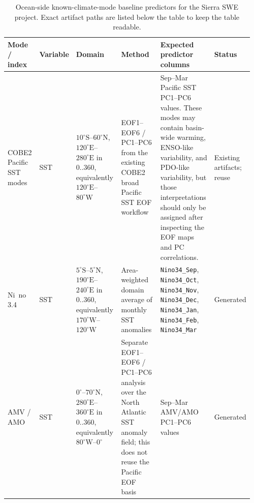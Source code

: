 \documentclass[11pt]{article}
\begin{document}
\begin{table}[h]
\centering
\small
\begin{tabular}{>{\raggedright\arraybackslash}p{0.14\linewidth}
                >{\raggedright\arraybackslash}p{0.08\linewidth}
                >{\raggedright\arraybackslash}p{0.20\linewidth}
                >{\raggedright\arraybackslash}p{0.20\linewidth}
                >{\raggedright\arraybackslash}p{0.24\linewidth}
                >{\raggedright\arraybackslash}p{0.10\linewidth}}
\toprule
Mode / index & Variable & Domain & Method & Expected predictor columns & Status \\
\midrule
COBE2 Pacific SST modes
& SST
& $10^\circ\mathrm{S}$--$60^\circ\mathrm{N}$, $120^\circ\mathrm{E}$--$280^\circ\mathrm{E}$ in $0..360$, equivalently $120^\circ\mathrm{E}$--$80^\circ\mathrm{W}$
& EOF1--EOF6 / PC1--PC6 from the existing COBE2 broad Pacific SST EOF workflow
& Sep--Mar Pacific SST PC1--PC6 values. These modes may contain basin-wide warming, ENSO-like variability, and PDO-like variability, but those interpretations should only be assigned after inspecting the EOF maps and PC correlations.
& Existing artifacts; reuse \\

Ni~no 3.4
& SST
& $5^\circ\mathrm{S}$--$5^\circ\mathrm{N}$, $190^\circ\mathrm{E}$--$240^\circ\mathrm{E}$ in $0..360$, equivalently $170^\circ\mathrm{W}$--$120^\circ\mathrm{W}$
& Area-weighted domain average of monthly SST anomalies
& \texttt{Nino34\_Sep}, \texttt{Nino34\_Oct}, \texttt{Nino34\_Nov}, \texttt{Nino34\_Dec}, \texttt{Nino34\_Jan}, \texttt{Nino34\_Feb}, \texttt{Nino34\_Mar}
& Generated \\

AMV / AMO
& SST
& $0^\circ$--$70^\circ\mathrm{N}$, $280^\circ\mathrm{E}$--$360^\circ\mathrm{E}$ in $0..360$, equivalently $80^\circ\mathrm{W}$--$0^\circ$
& Separate EOF1--EOF6 / PC1--PC6 analysis over the North Atlantic SST anomaly field; this does not reuse the Pacific EOF basis
& Sep--Mar AMV/AMO PC1--PC6 values
& Generated \\
\bottomrule
\end{tabular}
\caption{Ocean-side known-climate-mode baseline predictors for the Sierra SWE project. Exact artifact paths are listed below the table to keep the table readable.}
\label{tab:swe_known_climate_mode_baseline}
\end{table}
\end{document}
